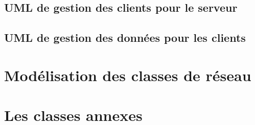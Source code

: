 \documentclass[a4paper,11pt]{report}
\begin{document}
\subsection{UML de gestion des clients pour le serveur}

\subsection{UML de gestion des données pour les clients}


\section{Modélisation des classes de réseau}



\section{Les classes annexes}
\end{document}
